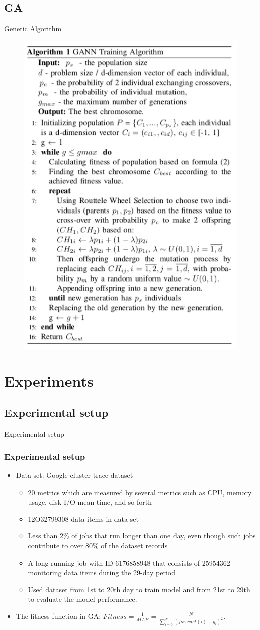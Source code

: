 \documentclass{beamer}
\begin{document}
\subsection{GA}
\begin{frame}{Genetic Algorithm}
	\begin{figure}
		\includegraphics[width=0.45 \textwidth]{slide-GA-algo.png} %
		\label{fig:ga}			
	\end{figure}
\end{frame}

\section{Experiments}
\subsection{Experimental setup}
\begin{frame}{Experimental setup}
	\frametitle{Experimental setup}
	\begin{itemize}
		\item {
			Data set: Google cluster trace dataset
			\begin{itemize}
			\item 20 metrics which are measured by several metrics such as CPU, memory usage, disk I/O mean time, and so forth
			\item 12O32799308 data items in data set
			\item  Less than 2\% of jobs that run longer than one day, even though such jobs contribute to over 80\% of the dataset records
			\item A long-running job with ID 6176858948 that consists of 25954362 monitoring data items during the 29-day period
			\item Used dataset from 1st to 20th day to train model and from 21st to 29th to evaluate the model performance.
			\end{itemize}
		}
		\item{
			The fitness function in GA: \newline
			$Fitness = \displaystyle \frac{1}{MAE} = \frac{N}{ \displaystyle \sum_{i=0}^N( forecast(i) - y_i)^2 }	\label{eq_fitness} $. 
			}
	\end{itemize}
\end{frame}
\end{document}
